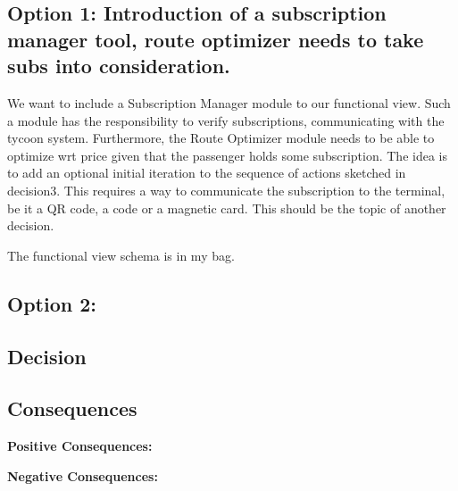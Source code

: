 \subsection*{Option 1: Introduction of a subscription manager tool, route optimizer needs to take subs into consideration.}
We want to include a Subscription Manager module to our functional view. 
Such a module has the responsibility to verify subscriptions, communicating with the tycoon system.
Furthermore, the Route Optimizer module needs to be able to optimize wrt price given that the passenger holds some subscription.
The idea is to add an optional initial iteration to the sequence of actions sketched in decision3.
This requires a way to communicate the subscription to the terminal, be it a QR code, a code or a magnetic card. 
This should be the topic of another decision.

The functional view schema is in my bag.

\subsection*{Option 2: }


\subsection*{Decision}

\subsection*{Consequences}
\textbf{Positive Consequences:}
\begin{itemize}
\end{itemize}
\textbf{Negative Consequences:}
\begin{itemize}
\end{itemize}